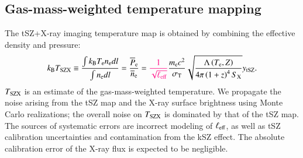 \documentclass[twocolumn,traditabstract]{aa}
\newcommand{\ccor}[1]{\textcolor{Mypink}{#1}}
\def\TSZ {T_{\rm SZX}}
\begin{document}
\subsection{Gas-mass-weighted temperature mapping}
The tSZ+X-ray imaging temperature map is obtained by combining the effective density and pressure: 
\begin{equation}
	k_{\rm B} \TSZ 
	\equiv \frac{\int k_{\rm B} T_{\rm e} n_{\rm e} dl}{\int n_{\rm e} dl} 
	= \frac{\overline{P}_{\rm e}}{\overline{n}_{\rm e}} = \ccor{\frac{1}{\sqrt{\ell_{\rm eff}}}} \frac{m_{\rm e} c^2}{\sigma_{\rm T}} \sqrt{\frac{\Lambda\left(T_{\rm e}, Z\right)}{4 \pi \left(1+z\right)^4 S_{\rm X}}} y_{\rm tSZ}.
\label{eq:pseudo_tsz}
\end{equation}
\ccor{$\TSZ$ is an estimate of the gas-mass-weighted temperature.} We propagate the noise arising from the tSZ map and the X-ray surface brightness using Monte Carlo realizations; the overall noise on $\TSZ$ is dominated by that of the tSZ map. \ccor{The sources of systematic errors are incorrect modeling of $\ell_{\rm eff}$, as well as tSZ calibration uncertainties and contamination from the kSZ effect. The absolute calibration error of the X-ray flux is expected to be negligible.}
\end{document}
